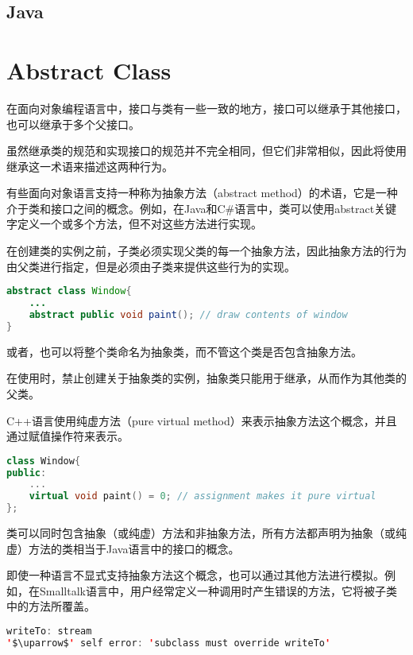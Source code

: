 \subsection{Java}



\section{Abstract Class}


在面向对象编程语言中，接口与类有一些一致的地方，接口可以继承于其他接口，也可以继承于多个父接口。


虽然继承类的规范和实现接口的规范并不完全相同，但它们非常相似，因此将使用继承这一术语来描述这两种行为。

有些面向对象语言支持一种称为抽象方法（abstract method）的术语，它是一种介于类和接口之间的概念。例如，在Java和C\#语言中，类可以使用abstract关键字定义一个或多个方法，但不对这些方法进行实现。

在创建类的实例之前，子类必须实现父类的每一个抽象方法，因此抽象方法的行为由父类进行指定，但是必须由子类来提供这些行为的实现。



\begin{lstlisting}[language=Java]
abstract class Window{
	...
	abstract public void paint(); // draw contents of window
}
\end{lstlisting}

或者，也可以将整个类命名为抽象类，而不管这个类是否包含抽象方法。

在使用时，禁止创建关于抽象类的实例，抽象类只能用于继承，从而作为其他类的父类。

C++语言使用纯虚方法（pure virtual method）来表示抽象方法这个概念，并且通过赋值操作符来表示。

\begin{lstlisting}[language=C++]
class Window{
public:
	...
	virtual void paint() = 0; // assignment makes it pure virtual
};
\end{lstlisting}

类可以同时包含抽象（或纯虚）方法和非抽象方法，所有方法都声明为抽象（或纯虚）方法的类相当于Java语言中的接口的概念。


即使一种语言不显式支持抽象方法这个概念，也可以通过其他方法进行模拟。例如，在Smalltalk语言中，用户经常定义一种调用时产生错误的方法，它将被子类中的方法所覆盖。

\begin{lstlisting}[language=Java]
writeTo: stream
'$\uparrow$' self error: 'subclass must override writeTo'
\end{lstlisting}

